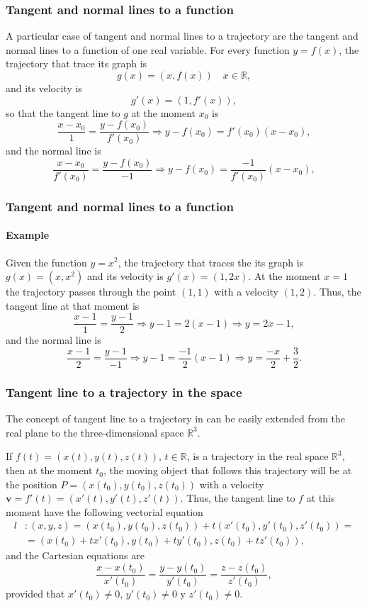 \begin{frame}
\frametitle{Tangent and normal lines to a function}
A particular case of tangent and normal lines to a trajectory are the tangent and normal lines to a function of one real variable. 
For every function $y=f(x)$, the trajectory that trace its graph is
\[
g(x) = (x,f(x))  \quad x\in \mathbb{R},
\]
and its velocity is 
\[
g'(x) = (1,f'(x)),
\]
so that the tangent line to $g$ at the moment $x_0$ is
\[
\frac{x-x_0}{1} = \frac{y-f(x_0)}{f'(x_0)} \Rightarrow y-f(x_0) = f'(x_0)(x-x_0),
\]
and the normal line is 
\[
\frac{x-x_0}{f'(x_0)} = \frac{y-f(x_0)}{-1} \Rightarrow y-f(x_0) = \frac{-1}{f'(x_0)}(x-x_0),
\]
\end{frame}


\begin{frame}
\frametitle{Tangent and normal lines to a function}
\framesubtitle{Example}
Given the function $y=x^2$, the trajectory that traces the its graph is $g(x)=(x,x^2)$ and its velocity is 
$g'(x)=(1,2x)$. At the moment $x=1$ the trajectory passes through the point $(1,1)$ with a velocity $(1,2)$.
Thus, the tangent line at that moment is 
\[
\frac{x-1}{1} = \frac{y-1}{2} \Rightarrow y-1 = 2(x-1) \Rightarrow y = 2x-1,
\]
and the normal line is 
\[
\frac{x-1}{2} = \frac{y-1}{-1} \Rightarrow y-1 = \frac{-1}{2}(x-1) \Rightarrow y = \frac{-x}{2}+\frac{3}{2}.
\]
\begin{center}

\end{center}
\end{frame}


\begin{frame}
\frametitle{Tangent line to a trajectory in the space}
The concept of tangent line to a trajectory in can be easily extended from the real plane to the three-dimensional space $\mathbb{R}^3$.

If $f(t)=(x(t),y(t),z(t))$, $t\in \mathbb{R}$, is a trajectory in the real space $\mathbb{R}^3$, then at the moment $t_0$, the moving object that follows this trajectory will be at the position $P=(x(t_0),y(t_0),z(t_0))$ with a velocity $\mathbf{v}=f'(t)=(x'(t),y'(t),z'(t))$.
Thus, the tangent line to $f$ at this moment have the following vectorial equation
\begin{align*}
l&: (x,y,z)=(x(t_0),y(t_0),z(t_0))+t(x'(t_0),y'(t_0),z'(t_0)) =\\
&= (x(t_0)+tx'(t_0),y(t_0)+ty'(t_0),z(t_0)+tz'(t_0)),
\end{align*}
and the Cartesian equations are 
\[
\frac{x-x(t_0)}{x'(t_0)}=\frac{y-y(t_0)}{y'(t_0)}=\frac{z-z(t_0)}{z'(t_0)},
\]
provided that $x'(t_0)\neq 0$, $y'(t_0)\neq 0$ y $z'(t_0)\neq 0$.
\end{frame}


